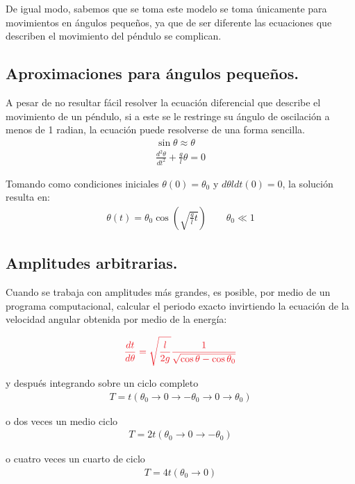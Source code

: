 \documentclass[12pt]{article}
\begin{document}
De igual modo, sabemos que se toma este modelo se toma únicamente para movimientos en ángulos pequeños, ya que de ser diferente las ecuaciones que describen el movimiento del péndulo se complican.

\subsection*{\textcolor{NavyBlue}{Aproximaciones para ángulos pequeños.}}
A pesar de no resultar fácil resolver la ecuación diferencial que describe el movimiento de un péndulo, si a este se le restringe su ángulo de oscilación a menos de 1 radian, la ecuación puede resolverse de una forma sencilla.
\begin{eqnarray*}
\sin \theta \approx \theta \\
\frac{d^2 \theta}{dt^2} + \frac{g}{l}\theta = 0
\end{eqnarray*}

Tomando como condiciones iniciales $\theta (0) = \theta_0$ y $d\theta l dt(0) = 0$, la solución resulta en:
\begin{eqnarray*}
\theta(t) = \theta_0 \cos \left( \sqrt{\frac{g}{l}t} \right)  \qquad \theta_0 \ll 1 
\end{eqnarray*}

\subsection*{\textcolor{NavyBlue}{Amplitudes arbitrarias.}}
Cuando se trabaja con amplitudes más grandes, es posible, por medio de un programa computacional, calcular el periodo exacto invirtiendo la ecuación de la velocidad angular obtenida por medio de la energía:

\begin{eqnarray*}
\textcolor{Red}{\frac{dt}{d \theta} = \sqrt{\frac{l}{2g}} \frac{1}{\sqrt{\cos\theta -  \cos\theta_0}}}
\end{eqnarray*}

y después integrando sobre un ciclo completo
\begin{eqnarray*}
T = t(\theta_0 \to 0 \to -\theta_0 \to 0 \to \theta_0)
\end{eqnarray*}

o dos veces un medio ciclo
\begin{eqnarray*}
T=2t(\theta_0 \to 0 \to -\theta_0)
\end{eqnarray*}

o cuatro veces un cuarto de ciclo
\begin{eqnarray*}
T=4t(\theta_0 \to 0)
\end{eqnarray*}
\end{document}
